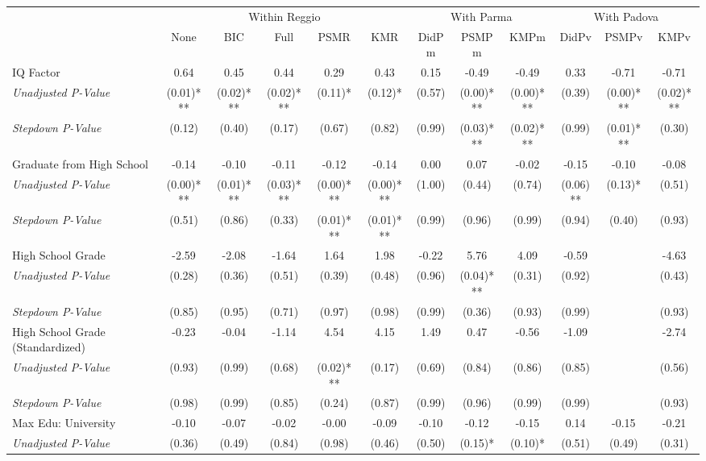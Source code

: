\begin{tabular}{l c c c c c c c c c c c}
\toprule
& \multicolumn{5}{c}{Within Reggio} & \multicolumn{3}{c}{With Parma} & \multicolumn{3}{c}{With Padova} \\\cmidrule(lr){2-6} \cmidrule(lr){7-9} \cmidrule(lr){10-12}
 & None & BIC & Full & PSMR & KMR & DidPm & PSMPm & KMPm & DidPv & PSMPv & KMPv \\
\midrule
IQ Factor & 0.64 & 0.45 & 0.44 & 0.29 & 0.43 & 0.15 & -0.49 & -0.49 & 0.33 & -0.71 & -0.71 \\
\quad \textit{Unadjusted P-Value} & (0.01)*** & (0.02)*** & (0.02)*** & (0.11)* & (0.12)* & (0.57) & (0.00)*** & (0.00)*** & (0.39) & (0.00)*** & (0.02)*** \\
\quad \textit{Stepdown P-Value} & (0.12) & (0.40) & (0.17) & (0.67) & (0.82) & (0.99) & (0.03)*** & (0.02)*** & (0.99) & (0.01)*** & (0.30) \\
Graduate from High School & -0.14 & -0.10 & -0.11 & -0.12 & -0.14 & 0.00 & 0.07 & -0.02 & -0.15 & -0.10 & -0.08 \\
\quad \textit{Unadjusted P-Value} & (0.00)*** & (0.01)*** & (0.03)*** & (0.00)*** & (0.00)*** & (1.00) & (0.44) & (0.74) & (0.06)** & (0.13)* & (0.51) \\
\quad \textit{Stepdown P-Value} & (0.51) & (0.86) & (0.33) & (0.01)*** & (0.01)*** & (0.99) & (0.96) & (0.99) & (0.94) & (0.40) & (0.93) \\
High School Grade & -2.59 & -2.08 & -1.64 & 1.64 & 1.98 & -0.22 & 5.76 & 4.09 & -0.59 & & -4.63 \\
\quad \textit{Unadjusted P-Value} & (0.28) & (0.36) & (0.51) & (0.39) & (0.48) & (0.96) & (0.04)*** & (0.31) & (0.92) & & (0.43) \\
\quad \textit{Stepdown P-Value} & (0.85) & (0.95) & (0.71) & (0.97) & (0.98) & (0.99) & (0.36) & (0.93) & (0.99) & & (0.93) \\
High School Grade (Standardized) & -0.23 & -0.04 & -1.14 & 4.54 & 4.15 & 1.49 & 0.47 & -0.56 & -1.09 & & -2.74 \\
\quad \textit{Unadjusted P-Value} & (0.93) & (0.99) & (0.68) & (0.02)*** & (0.17) & (0.69) & (0.84) & (0.86) & (0.85) & & (0.56) \\
\quad \textit{Stepdown P-Value} & (0.98) & (0.99) & (0.85) & (0.24) & (0.87) & (0.99) & (0.96) & (0.99) & (0.99) & & (0.93) \\
Max Edu: University & -0.10 & -0.07 & -0.02 & -0.00 & -0.09 & -0.10 & -0.12 & -0.15 & 0.14 & -0.15 & -0.21 \\
\quad \textit{Unadjusted P-Value} & (0.36) & (0.49) & (0.84) & (0.98) & (0.46) & (0.50) & (0.15)* & (0.10)* & (0.51) & (0.49) & (0.31) \\

\end{tabular}
